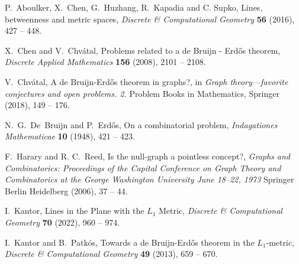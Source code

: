 \documentclass[12pt]{article}
\begin{document}
\begin{thebibliography}{10}

P.~Aboulker, X.~Chen, G.~Huzhang, R.~Kapadia and C. Supko,
Lines, betweenness and metric spaces,
{\em Discrete \& Computational Geometry\/} {\bf 56} (2016),
427 -- 448.

X.~Chen and V.~Chv\'{a}tal,
Problems related to a de Bruijn - Erd\H os theorem,
{\em Discrete Applied Mathematics\/} {\bf 156} (2008),
  2101 -- 2108.

V.~Chv\'{a}tal,
A de Bruijn-Erd\H{o}s theorem in graphs?,
in {\em Graph theory—favorite conjectures and open problems. 2.\/} 
Problem Books in Mathematics, Springer (2018),
149 -- 176.

N.~G.~De~Bruijn and P.~Erd\H{o}s,
On a combinatorial problem,
{\em Indagationes Mathematicae\/} {\bf 10} (1948),
421 -- 423.

F.~Harary and R. C.~Reed,
Is the null-graph a pointless concept?,
{\em Graphs and Combinatorics: Proceedings of the Capital Conference on Graph Theory and Combinatorics at the George Washington University June 18–22, 1973\/} Springer Berlin Heidelberg (2006),
37 -- 44.

I.~Kantor,
Lines in the Plane with the $L_1$ Metric,
{\em Discrete \& Computational Geometry\/} {\bf 70} (2022),
960 -- 974.

I.~Kantor and B.~Patk\'os,
Towards a de Bruijn-Erd\H{o}s theorem in the $L_1$-metric,
{\em Discrete \& Computational Geometry\/} {\bf 49} (2013),
659 -- 670.

\end{thebibliography}
\end{document}
